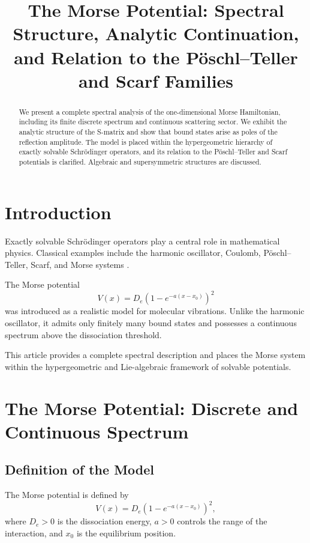 \documentclass[11pt]{article}
\title{The Morse Potential: Spectral Structure, Analytic Continuation,\\
and Relation to the P\"oschl--Teller and Scarf Families}
\author{}
\date{}
\begin{document}
\maketitle

\begin{abstract}
We present a complete spectral analysis of the one-dimensional Morse
Hamiltonian, including its finite discrete spectrum and continuous
scattering sector. We exhibit the analytic structure of the S-matrix
and show that bound states arise as poles of the reflection amplitude.
The model is placed within the hypergeometric hierarchy of exactly
solvable Schr\"odinger operators, and its relation to the
P\"oschl--Teller and Scarf potentials is clarified.
Algebraic and supersymmetric structures are discussed.
\end{abstract}

\section{Introduction}

Exactly solvable Schr\"odinger operators play a central role in
mathematical physics. Classical examples include the harmonic
oscillator, Coulomb, P\"oschl--Teller, Scarf, and Morse systems
\cite{flugge,cooper-khare-sukhatme}.

The Morse potential
\begin{equation}
V(x)=D_e\left(1-e^{-a(x-x_0)}\right)^2
\end{equation}
was introduced as a realistic model for molecular vibrations.
Unlike the harmonic oscillator, it admits only finitely many
bound states and possesses a continuous spectrum above the
dissociation threshold.

This article provides a complete spectral description and places
the Morse system within the hypergeometric and Lie-algebraic
framework of solvable potentials.


\section{The Morse Potential: Discrete and Continuous Spectrum}

\subsection{Definition of the Model}

The Morse potential is defined by
\begin{equation}
V(x)=D_e\left(1-e^{-a(x-x_0)}\right)^2,
\end{equation}
where $D_e>0$ is the dissociation energy, $a>0$ controls the range of the interaction, and $x_0$ is the equilibrium position.
\end{document}
